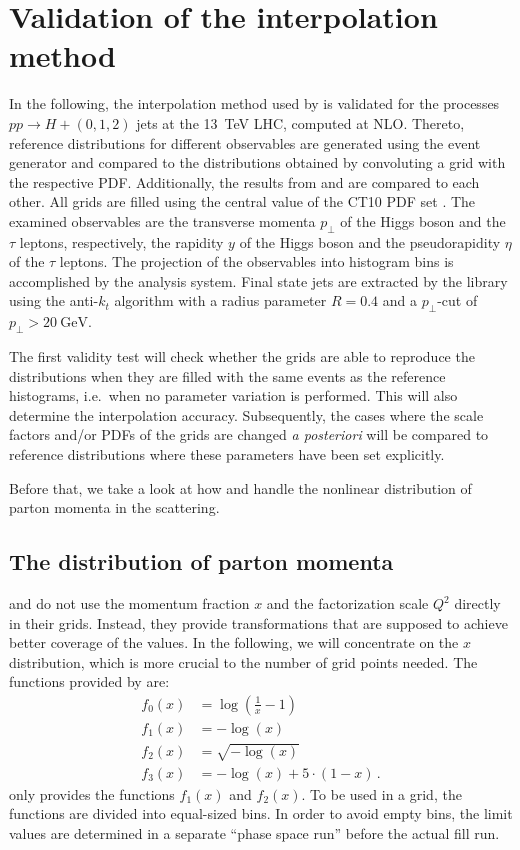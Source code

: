 
\chapter{Validation of the interpolation method}
\label{ch:validation}
%
In the following, the interpolation method used by \mcgrid{} is validated for the processes $pp \rightarrow H + (0,1,2)$ jets at the \SI{13}{\tera\electronvolt} LHC, computed at NLO.
Thereto, reference distributions for different observables are generated using the \sherpa{} event generator and compared to the distributions obtained by convoluting a grid with the respective PDF.
Additionally, the results from \appl{} and \fnlo{} are compared to each other.
All grids are filled using the central value of the CT10 PDF set \cite{ct10}.
The examined observables are the transverse momenta $p_\perp$ of the Higgs boson and the $\tau$ leptons, respectively, the rapidity $y$ of the Higgs boson and the pseudorapidity $\eta$ of the $\tau$ leptons.
The projection of the observables into histogram bins is accomplished by the \rivet{} analysis system.
Final state jets are extracted by the \fastjet{} library \cite{fastjet_manual} using the anti-$k_t$ algorithm \cite{anti_kt} with a radius parameter $R=0.4$ and a $p_\perp$-cut of $p_\perp > \SI{20}{\giga\electronvolt}$.

The first validity test will check whether the grids are able to reproduce the distributions when they are filled with the same events as the reference histograms, i.e.\ when no parameter variation is performed.
This will also determine the interpolation accuracy.
Subsequently, the cases where the scale factors and/or PDFs of the grids are changed \textit{a posteriori} will be compared to reference distributions where these parameters have been set explicitly.

Before that, we take a look at how \appl{} and \fnlo{} handle the nonlinear distribution of parton momenta in the scattering.
%
\section{The distribution of parton momenta}
\label{sec:xtransform}
\appl{} and \fnlo{} do not use the momentum fraction $x$ and the factorization scale $Q^2$ directly in their grids.
Instead, they provide transformations that are supposed to achieve better coverage of the values.
In the following, we will concentrate on the $x$ distribution, which is more crucial to the number of grid points needed.
The functions provided by \appl{} are:
%
\begin{align}
	f_0(x)	&= \log(\frac{1}{x} -1) \\
	f_1(x)	&= -\log(x) \\
	f_2(x)	&= \sqrt{-\log(x)} \\
	f_3(x)	&= -\log(x) + 5 \cdot (1-x) \, .
\end{align}
%
\fnlo{} only provides the functions $f_1(x)$ and $f_2(x)$.
To be used in a grid, the functions are divided into equal-sized bins.
In order to avoid empty bins, the limit values are determined in a separate \enquote{phase space run} before the actual fill run.

